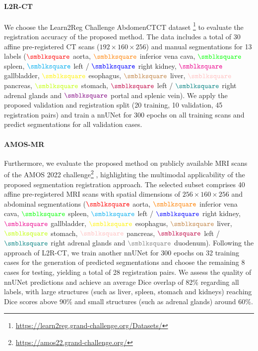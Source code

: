 \paragraph{L2R-CT}
We choose the Learn2Reg Challenge AbdomenCTCT dataset \footnote{\url{https://learn2reg.grand-challenge.org/Datasets/}} to evaluate the registration accuracy of the proposed method. The data includes a total of 30 affine pre-registered CT scans ($192\times160\times256$) and manual segmentations for 13 labels ($\color{red}{\smblksquare}$ aorta, $\color{orange}{\smblksquare}$ inferior vena cava, $\color{green}{\smblksquare}$ spleen, $\color{cyan}{\smblksquare}$ left / $\color{blue}{\smblksquare}$ right kidney, $\color{magenta}{\smblksquare}$ gallbladder, $\color{yellow}{\smblksquare}$ esophagus, $\color{brown}{\smblksquare}$ liver, $\color{pink}{\smblksquare}$ pancreas, $\color{lime}{\smblksquare}$ stomach,  $\color{purple}{\smblksquare}$ left / $\color{teal}{\smblksquare}$  right adrenal glands and $\color{violet}{\smblksquare}$ portal and splenic vein). We apply the proposed validation and registration split (20 training, 10 validation, 45 registration pairs) and train a nnUNet for 300 epochs on all training scans and predict segmentations for all validation cases. 

\paragraph{AMOS-MR}
Furthermore, we evaluate the proposed method on publicly available MRI scans of the AMOS 2022 challenge\footnote{\url{https://amos22.grand-challenge.org/}} \citep{AMOS}, highlighting the multimodal applicability of the proposed segmentation registration approach. The selected subset comprises 40 affine pre-registered  MRI scans with spatial dimensions of $256\times160\times256$ and abdominal segmentations ($\color{red}{\smblksquare}$ aorta, $\color{orange}{\smblksquare}$ inferior vena cava,  $\color{green}{\smblksquare}$ spleen, $\color{cyan}{\smblksquare}$ left / $\color{blue}{\smblksquare}$ right kidney, $\color{magenta}{\smblksquare}$ gallbladder, $\color{yellow}{\smblksquare}$ esophagus, $\color{brown}{\smblksquare}$ liver, $\color{lime}{\smblksquare}$  stomach, $\color{pink}{\smblksquare}$ pancreas, $\color{purple}{\smblksquare}$ left / $\color{teal}{\smblksquare}$  right adrenal glands and $\color{gray}{\smblksquare}$ duodenum). Following the approach of L2R-CT, we train another nnUNet for 300 epochs on 32 training cases for the generation of predicted segmentations and choose the remaining 8 cases for testing, yielding a total of 28 registration pairs. We assess the quality of nnUNet predictions and achieve an average Dice overlap of 82\% regarding all labels, with large structures (such as liver, spleen, stomach and kidneys) reaching Dice scores above 90\% and small structures (such as adrenal glands) around 60\%.



